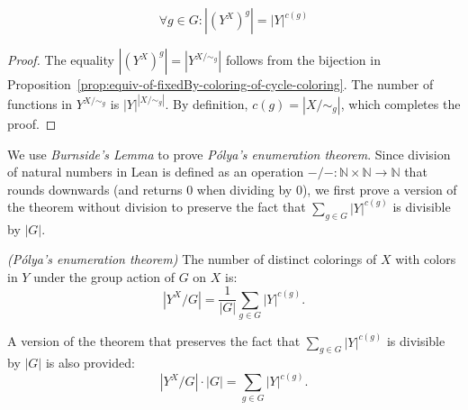 \begin{proposition}
  \label{prop:forall-card-pow-numCyclesOfGroup-eq-card-fixedBy}
  \leanok
  \begin{equation*}
    \forall g \in G: |(Y^X)^g| = |Y|^{c(g)}
  \end{equation*}
\end{proposition}

\begin{proof}
  \leanok
  The equality $|(Y^X)^g| = |Y^{X/\sim_g}|$ follows from the bijection in Proposition~\ref{prop:equiv-of-fixedBy-coloring-of-cycle-coloring}. The number of functions in $Y^{X/\sim_g}$ is $|Y|^{|X/\sim_g|}$. By definition, $c(g) = |X/\sim_g|$, which completes the proof.
\end{proof}

We use \emph{Burnside's Lemma} to prove \emph{Pólya's enumeration theorem}. Since division of natural numbers in Lean is defined as an operation ${-} / {-} : \mathbb{N} \times \mathbb{N} \to \mathbb{N}$ that rounds downwards (and returns $0$ when dividing by $0$), we first prove a version of the theorem without division to preserve the fact that $\sum_{g \in G} |Y|^{c(g)}$ is divisible by $|G|$.

\begin{theorem}
  \label{prop:numDistinctColorings-eq-sum-card-pow-numCyclesOfGroup-div-mul-card-group}
  \leanok
  \emph{(Pólya's enumeration theorem)} The number of distinct colorings of $X$ with colors in $Y$ under the group action of $G$ on $X$ is:
  \begin{equation*}
    |Y^X/G| = \frac{1}{|G|} \sum_{g \in G} |Y|^{c(g)}.
  \end{equation*}

  A version of the theorem that preserves the fact that $\sum_{g \in G} |Y|^{c(g)}$ is divisible by $|G|$ is also provided:
  \begin{equation*}
    |Y^X/G| \cdot |G| = \sum_{g \in G} |Y|^{c(g)}.
  \end{equation*}
\end{theorem}

